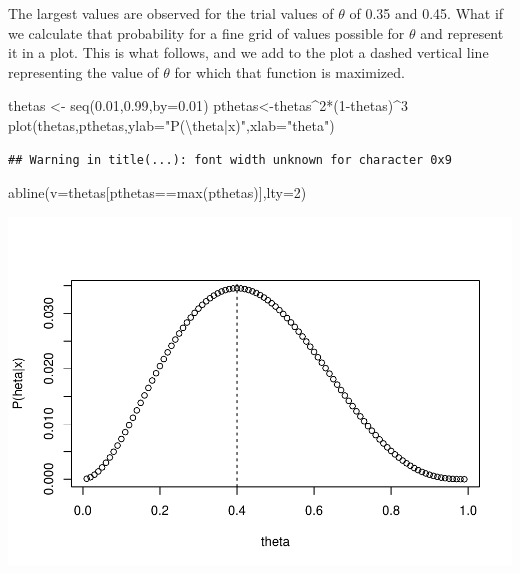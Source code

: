 \documentclass[
]{book}
\newenvironment{Shaded}{\begin{snugshade}}{\end{snugshade}}
\newcommand{\AttributeTok}[1]{\textcolor[rgb]{0.77,0.63,0.00}{#1}}
\newcommand{\DecValTok}[1]{\textcolor[rgb]{0.00,0.00,0.81}{#1}}
\newcommand{\FloatTok}[1]{\textcolor[rgb]{0.00,0.00,0.81}{#1}}
\newcommand{\FunctionTok}[1]{\textcolor[rgb]{0.00,0.00,0.00}{#1}}
\newcommand{\NormalTok}[1]{#1}
\newcommand{\OtherTok}[1]{\textcolor[rgb]{0.56,0.35,0.01}{#1}}
\newcommand{\SpecialCharTok}[1]{\textcolor[rgb]{0.00,0.00,0.00}{#1}}
\newcommand{\StringTok}[1]{\textcolor[rgb]{0.31,0.60,0.02}{#1}}
\begin{document}
The largest values are observed for the trial values of \(\theta\) of 0.35 and 0.45. What if we calculate that probability for a fine grid of values possible for \(\theta\) and represent it in a plot. This is what follows, and we add to the plot a dashed vertical line representing the value of \(\theta\) for which that function is maximized.

\begin{Shaded}
\begin{Highlighting}[]
\NormalTok{thetas }\OtherTok{\textless{}{-}} \FunctionTok{seq}\NormalTok{(}\FloatTok{0.01}\NormalTok{,}\FloatTok{0.99}\NormalTok{,}\AttributeTok{by=}\FloatTok{0.01}\NormalTok{)}
\NormalTok{pthetas}\OtherTok{\textless{}{-}}\NormalTok{thetas}\SpecialCharTok{\^{}}\DecValTok{2}\SpecialCharTok{*}\NormalTok{(}\DecValTok{1}\SpecialCharTok{{-}}\NormalTok{thetas)}\SpecialCharTok{\^{}}\DecValTok{3}
\FunctionTok{plot}\NormalTok{(thetas,pthetas,}\AttributeTok{ylab=}\StringTok{"P(}\SpecialCharTok{\textbackslash{}t}\StringTok{heta|x)"}\NormalTok{,}\AttributeTok{xlab=}\StringTok{"theta"}\NormalTok{)}
\end{Highlighting}
\end{Shaded}

\begin{verbatim}
## Warning in title(...): font width unknown for character 0x9
\end{verbatim}

\begin{Shaded}
\begin{Highlighting}[]
\FunctionTok{abline}\NormalTok{(}\AttributeTok{v=}\NormalTok{thetas[pthetas}\SpecialCharTok{==}\FunctionTok{max}\NormalTok{(pthetas)],}\AttributeTok{lty=}\DecValTok{2}\NormalTok{)}
\end{Highlighting}
\end{Shaded}

\includegraphics{ECOMODbook_files/figure-latex/ch13.3-1.pdf}
\end{document}
